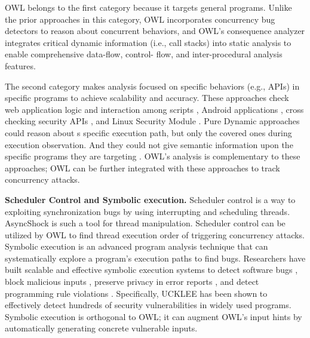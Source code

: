 OWL belongs to the first category because it targets general
programs. Unlike the prior approaches in this category,
OWL incorporates concurrency bug detectors to reason about
concurrent behaviors, and OWL’s consequence analyzer integrates
critical dynamic information (i.e., call stacks) into
static analysis to enable comprehensive data-flow, control-
flow, and inter-procedural analysis features.

The second category \cite{felmetsger2010toward,arzt2014flowdroid,srivastava2011security,zhang:usenix:sec02,paleari2008race,pratikakis2011locksmith} makes analysis
focused on specific behaviors (e.g., APIs) in specific programs
to achieve scalability and accuracy. These approaches check
web application logic \cite{felmetsger2010toward} and interaction among scripts \cite{paleari2008race}, Android applications \cite{arzt2014flowdroid}, cross
checking security APIs \cite{srivastava2011security}, and Linux Security
Module \cite{zhang:usenix:sec02}. Pure Dynamic approaches could reason about s specific execution path, but only the covered ones during execution observation. And they could not give semantic information upon the specific programs they are targeting \cite{paleari2008race}. OWL’s analysis is complementary to these
approaches; OWL can be further integrated with these approaches
to track concurrency attacks.

\noindent
\textbf{Scheduler Control and Symbolic execution.} Scheduler control 
is a way to exploiting synchronization bugs by using interrupting and scheduling threads.
AsyncShock \cite{weichbrodt2016asyncshock} is such a tool for thread manipulation. Scheduler control can be utilized by OWL to 
find thread execution order of triggering concurrency attacks.
Symbolic execution is an advanced program
analysis technique that can systematically explore a program’s
execution paths to find bugs. Researchers have built
scalable and effective symbolic execution systems to detect
software bugs \cite{dart:pldi,cute:fse,godefroid:grammar-fuzzing,godefroid:whitebox-fuzzing,klee:osdi08,yang:malicious-disk:oakland06,cadar:exe:ccs06,s2e:hotdep09,taas:socc10,ramos2015under}, block
malicious inputs \cite{costa:openbsd}, preserve privacy in error reports \cite{castro:bug-report-privacy},
and detect programming rule violations \cite{woodpecker:asplos13}. Specifically,
UCKLEE \cite{ramos2015under} has been shown to effectively detect hundreds
of security vulnerabilities in widely used programs. Symbolic
execution is orthogonal to OWL; it can augment OWL’s input
hints by automatically generating concrete vulnerable inputs.